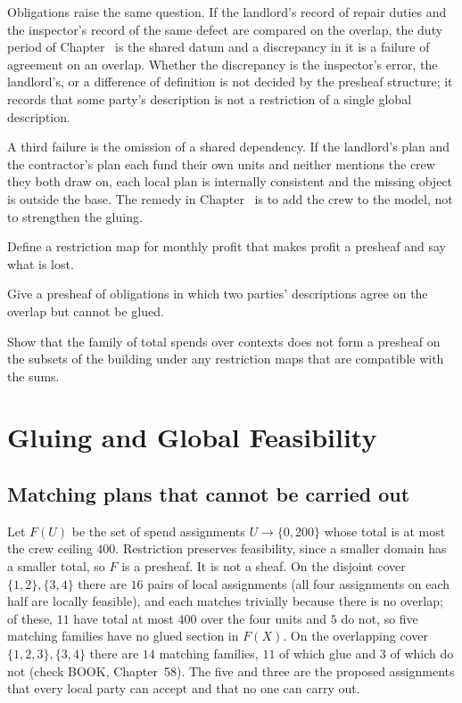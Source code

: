 Obligations raise the same question. If the landlord's record of repair duties and the inspector's record of the same defect are compared on the overlap, the duty period of Chapter~ is the shared datum and a discrepancy in it is a failure of agreement on an overlap. Whether the discrepancy is the inspector's error, the landlord's, or a difference of definition is not decided by the presheaf structure; it records that some party's description is not a restriction of a single global description.

A third failure is the omission of a shared dependency. If the landlord's plan and the contractor's plan each fund their own units and neither mentions the crew they both draw on, each local plan is internally consistent and the missing object is outside the base. The remedy in Chapter~ is to add the crew to the model, not to strengthen the gluing.

\begin{exercise}Define a restriction map for monthly profit that makes profit a presheaf and say what is lost.\end{exercise}
\begin{exercise}Give a presheaf of obligations in which two parties' descriptions agree on the overlap but cannot be glued.\end{exercise}
\begin{exercise}Show that the family of total spends over contexts does not form a presheaf on the subsets of the building under any restriction maps that are compatible with the sums.\end{exercise}

\chapter{Gluing and Global Feasibility}\label{ch:58}

\section{Matching plans that cannot be carried out}

Let $F(U)$ be the set of spend assignments $U\to\{0,200\}$ whose total is at most the crew ceiling $400$. Restriction preserves feasibility, since a smaller domain has a smaller total, so $F$ is a presheaf. It is not a sheaf. On the disjoint cover $\{1,2\},\{3,4\}$ there are $16$ pairs of local assignments (all four assignments on each half are locally feasible), and each matches trivially because there is no overlap; of these, $11$ have total at most $400$ over the four units and $5$ do not, so five matching families have no glued section in $F(X)$. On the overlapping cover $\{1,2,3\},\{3,4\}$ there are $14$ matching families, $11$ of which glue and $3$ of which do not (check BOOK, Chapter~58). The five and three are the proposed assignments that every local party can accept and that no one can carry out.

